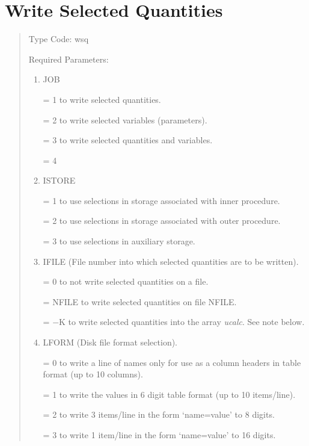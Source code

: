 \section{Write Selected Quantities}   
\begin{quotation}
\noindent     Type Code:   wsq
\vspace{5mm}

\noindent Required Parameters:
\begin{enumerate}
       \item  JOB

	          = 1 to write selected quantities.

	          = 2 to write selected variables (parameters).

	          = 3 to write selected quantities and variables.

			  = 4

       \item  ISTORE

	          = 1 to use selections in storage associated with inner
			  procedure.

	          = 2 to use selections in storage associated with outer
			  procedure.

	          = 3 to use selections in auxiliary storage.

       \item  IFILE (File number into which selected quantities are to be written).

              = 0 to not write selected quantities on a file.

              = NFILE to write selected quantities on file NFILE.

			  = $-$K to write selected quantities into the array {\em ucalc}.  See
			  note below.

       \item  LFORM (Disk file format selection).

	          = 0 to write a line of names only for use as a column headers
			  in table format \hspace*{1em}(up to 10 columns).

	          = 1 to write the values in 6 digit table format (up to 10
			  items/line).

	          = 2 to write 3 items/line in the form \lq name=value' to 8
			  digits.

	          = 3 to write 1 item/line in the form \lq name=value' to 16 digits.


\end{enumerate}
\end{quotation}
